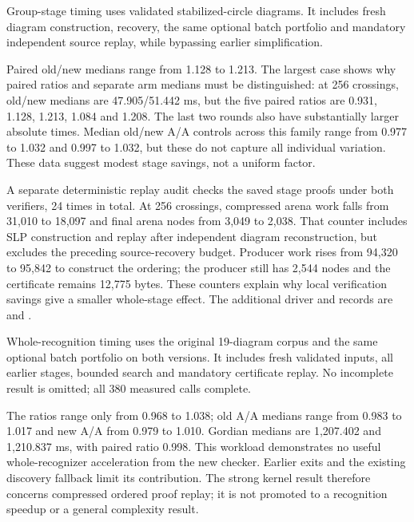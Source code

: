 Group-stage timing uses validated stabilized-circle diagrams. It includes
fresh diagram construction, recovery, the same optional batch portfolio and
mandatory independent source replay, while bypassing earlier simplification.



Paired old/new medians range from 1.128 to 1.213. The largest case shows why
paired ratios and separate arm medians must be distinguished: at 256 crossings,
old/new medians are 47.905/51.442 ms, but the five paired ratios are
0.931, 1.128, 1.213, 1.084 and 1.208. The last two rounds also have substantially
larger absolute times. Median old/new A/A controls across this family range
from 0.977 to 1.032 and 0.997 to 1.032, but these do not capture all individual
variation. These data suggest modest stage savings, not a uniform factor.

A separate deterministic replay audit checks the saved stage proofs under
both verifiers, 24 times in total. At 256 crossings, compressed arena work
falls from 31,010 to 18,097 and final arena nodes from 3,049 to 2,038. That
counter includes SLP construction and replay after independent diagram
reconstruction, but excludes the preceding source-recovery budget. Producer
work rises from 94,320 to 95,842 to construct the ordering; the producer still
has 2,544 nodes and the certificate remains 12,775 bytes. These counters
explain why local verification savings give a smaller whole-stage effect.
The additional driver and records are 
and .

Whole-recognition timing uses the original 19-diagram corpus and the same
optional batch portfolio on both versions. It includes fresh validated inputs,
all earlier stages, bounded search and mandatory certificate replay. No
incomplete result is omitted; all 380 measured calls complete.



The ratios range only from 0.968 to 1.038; old A/A medians range from 0.983 to
1.017 and new A/A from 0.979 to 1.010. Gordian medians are 1,207.402 and
1,210.837 ms, with paired ratio 0.998. This workload demonstrates no useful
whole-recognizer acceleration from the new checker. Earlier exits and the
existing discovery fallback limit its contribution. The strong kernel result
therefore concerns compressed ordered proof replay; it is not promoted to a
recognition speedup or a general complexity result.
